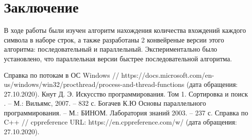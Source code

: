 \documentclass[12pt,a4paper]{article}
\numberwithin{equation}{section}
\begin{document}
\section*{\Huge Заключение}
\qquad В ходе работы были изучен алгоритм нахождения количества вхождений каждого символа в наборе строк, а также разработаны 2 конвейреные версии этого алгоритма: последовательный и параллельный. Экспериментально было установлено, что параллельная версии быстрее последовательной алгоритма.
\clearpage
\renewcommand\refname{Список использованной литературы}
\begin{thebibliography}{}
	 Справка по потокам в ОС Windows // https://docs.microsoft.com/en-us/windows/win32/procthread/process-and-thread-functions (дата обращения: 27.10.2020).
	 Кнут Д. Э. Искусство программирования. Том 1. Сортировка и поиск . -- М.: Вильямс, 2007. -- 832 с.
	 Богачев К.Ю Основы параллельного программирования. -- М.: БИНОМ. Лаборатория знаний 2003.  -- 237 с.
	 Справка по C++ // cppreference URL: https://en.cppreference.com/w/ (дата обращения: 27.10.2020).
\end{thebibliography}
\end{document}
